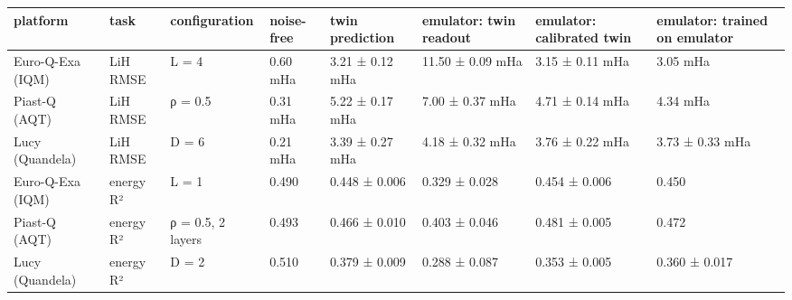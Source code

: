 \begin{tabular}{llllllll}
\toprule
platform & task & configuration & noise-free & twin prediction & emulator: twin readout & emulator: calibrated twin & emulator: trained on emulator \\
\midrule
Euro-Q-Exa (IQM) & LiH RMSE & L = 4 & 0.60 mHa & 3.21 ± 0.12 mHa & 11.50 ± 0.09 mHa & 3.15 ± 0.11 mHa & 3.05 mHa \\
Piast-Q (AQT) & LiH RMSE & ρ = 0.5 & 0.31 mHa & 5.22 ± 0.17 mHa & 7.00 ± 0.37 mHa & 4.71 ± 0.14 mHa & 4.34 mHa \\
Lucy (Quandela) & LiH RMSE & D = 6 & 0.21 mHa & 3.39 ± 0.27 mHa & 4.18 ± 0.32 mHa & 3.76 ± 0.22 mHa & 3.73 ± 0.33 mHa \\
Euro-Q-Exa (IQM) & energy R² & L = 1 & 0.490 & 0.448 ± 0.006 & 0.329 ± 0.028 & 0.454 ± 0.006 & 0.450 \\
Piast-Q (AQT) & energy R² & ρ = 0.5, 2 layers & 0.493 & 0.466 ± 0.010 & 0.403 ± 0.046 & 0.481 ± 0.005 & 0.472 \\
Lucy (Quandela) & energy R² & D = 2 & 0.510 & 0.379 ± 0.009 & 0.288 ± 0.087 & 0.353 ± 0.005 & 0.360 ± 0.017 \\
\bottomrule
\end{tabular}
